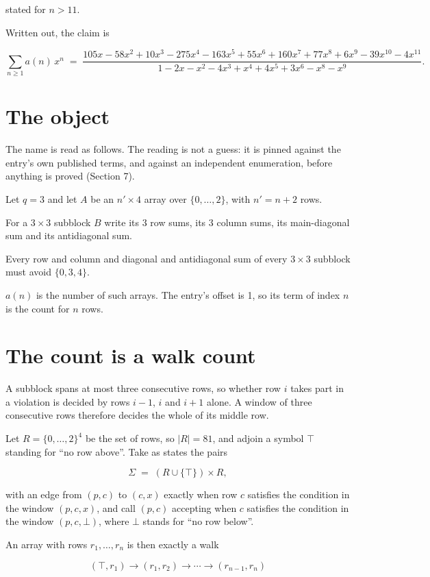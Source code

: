 \documentclass[11pt]{article}
\theoremstyle{definition}
\begin{document}
stated for $n > 11$.

Written out, the claim is

\[\sum_{n \ge 1} a(n)\,x^n \;=\; \frac{105x - 58x^{2} + 10x^{3} - 275x^{4} - 163x^{5} + 55x^{6} + 160x^{7} + 77x^{8} + 6x^{9} - 39x^{10} - 4x^{11}}{1 - 2x - x^{2} - 4x^{3} + x^{4} + 4x^{5} + 3x^{6} - x^{8} - x^{9}}.\]

\section{The object}

The name is read as follows. The reading is not a guess: it is pinned against the entry's own published terms, and against an independent enumeration, before anything is proved (Section 7).

Let $q = 3$ and let $A$ be an $n' \times 4$ array over $\{0,\dots,2\}$, with $n' = n + 2$ rows.

For a $3\times3$ subblock $B$ write its 3 row sums, its 3 column sums, its main-diagonal sum and its antidiagonal sum.

Every row and column and diagonal and antidiagonal sum of every $3\times3$ subblock must avoid $\{0, 3, 4\}$.

$a(n)$ is the number of such arrays. The entry's offset is 1, so its term of index $n$ is the count for $n$ rows.

\section{The count is a walk count}

A subblock spans at most three consecutive rows, so whether row $i$ takes part in a violation is decided by rows $i-1$, $i$ and $i+1$ alone. A window of three consecutive rows therefore decides the whole of its middle row.

Let $R = \{0,\dots,2\}^{4}$ be the set of rows, so $|R| = 81$, and adjoin a symbol $\top$ standing for ``no row above''. Take as states the pairs

\[\Sigma \;=\; (R \cup \{\top\}) \times R,\]

with an edge from $(p,c)$ to $(c,x)$ exactly when row $c$ satisfies the condition in the window $(p,c,x)$, and call $(p,c)$ accepting when $c$ satisfies the condition in the window $(p,c,\bot)$, where $\bot$ stands for ``no row below''.

An array with rows $r_1,\dots,r_n$ is then exactly a walk

\[(\top,r_1) \to (r_1,r_2) \to \cdots \to (r_{n-1},r_n)\]
\end{document}
